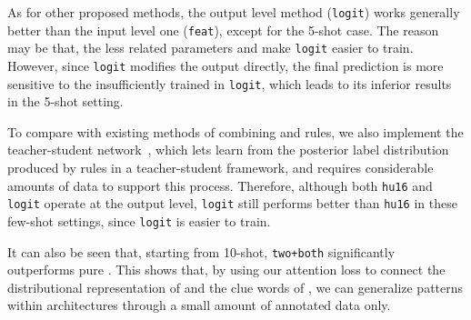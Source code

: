 As for other proposed methods, the output level method (\texttt{logit}) works generally better than the input level one (\texttt{feat}), except for the 5-shot case.
The reason may be that, the less \RE related parameters and 
make \texttt{logit} easier to train. 
However, since \texttt{logit} modifies the output directly, the final prediction is more sensitive to the insufficiently trained  in \texttt{logit}, which leads to its inferior results in the 5-shot setting.

To compare with existing methods of combining \NN and rules, we also implement the teacher-student
network~\cite{hu2016harnessing}, %
which lets \NN learn from the posterior label distribution produced by \FOL rules in a teacher-student framework,
and requires considerable amounts of data to support this process.
Therefore, although both \texttt{hu16} and \texttt{logit} operate at the output level, \texttt{logit}
still performs better than \texttt{hu16} in these few-shot settings, since \texttt{logit} is easier to train.


It can also be seen that, starting from 10-shot, \texttt{two+both} significantly outperforms pure \RE.
This shows that, by using our attention loss to connect the distributional representation of \NN and the clue words of \RE, we can generalize \RE patterns within \NN architectures through a small amount of annotated data only.


